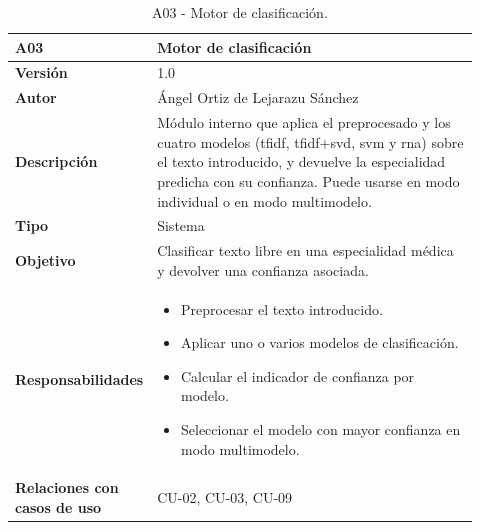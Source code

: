 \begin{table}[H]
	\centering
	\begin{tabular}{ p{0.21\linewidth} p{0.71\linewidth} }
		\toprule
		\textbf{A03}    & \textbf{Motor de clasificación}\\
		\toprule
		\textbf{Versión}         & 1.0 \\
		\textbf{Autor}           & Ángel Ortiz de Lejarazu Sánchez \\
		\textbf{Descripción}     & Módulo interno que aplica el preprocesado y los cuatro modelos (\gls{tfidf}, \gls{tfidf}+\gls{svd}, \gls{svm} y \gls{rna}) sobre el texto introducido, y devuelve la especialidad predicha con su confianza. Puede usarse en modo individual o en modo multimodelo. \\
		\textbf{Tipo}            & Sistema \\
		\textbf{Objetivo}        & Clasificar texto libre en una especialidad médica y devolver una confianza asociada. \\
		\textbf{Responsabilidades} &
		\begin{itemize}
			\item Preprocesar el texto introducido.
			\item Aplicar uno o varios modelos de clasificación.
			\item Calcular el indicador de confianza por modelo.
			\item Seleccionar el modelo con mayor confianza en modo multimodelo.
		\end{itemize} \\
		\textbf{Relaciones con casos de uso} & CU-02, CU-03, CU-09 \\
		\bottomrule
	\end{tabular}
	\caption{A03 - Motor de clasificación.}
\end{table}

